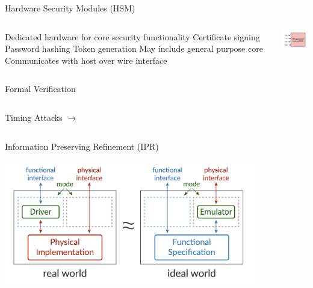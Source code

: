 \begin{frame}{Hardware Security Modules (HSM)}
\begin{columns}
  \centering
  \begin{outline}
  \1 Dedicated hardware for core security functionality
  \2 Certificate signing
  \2 Password hashing
  \2 Token generation
  \1 May include general purpose core
  \1 Communicates with host over wire interface
  \end{outline}

  \centering
  \begin{center}


  \includegraphics[width=3cm]{wire_diagram.png}
  \end{center}
\end{columns}
\end{frame}

\begin{frame}{Formal Verification}
\begin{columns}
  \centering
  \begin{outline}
  \1 Timing Attacks $\rightarrow$ 
  \end{outline}

  \centering
  \begin{center}

  \end{center}
\end{columns}
\end{frame}

\begin{frame}{Information Preserving Refinement (IPR)}
  \centering
  \begin{center}
    \includegraphics[width=11cm]{ipr.png}
  \end{center}
\end{frame}


